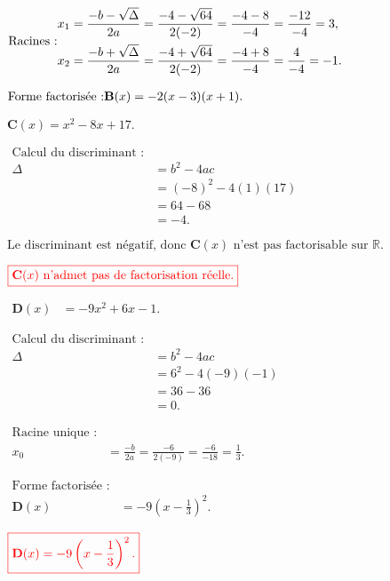 \documentclass[12pt,a4paper]{article}
\begin{document}
\begin{enumerate}
\(
\text{Racines :}\\
\begin{aligned}
x_1 &= \frac{-b - \sqrt{\Delta}}{2a} = \frac{-4 - \sqrt{64}}{2(-2)} = \frac{-4 - 8}{-4} = \frac{-12}{-4} = 3, \\
x_2 &= \frac{-b + \sqrt{\Delta}}{2a} = \frac{-4 + \sqrt{64}}{2(-2)} = \frac{-4 + 8}{-4} = \frac{4}{-4} = -1.
\end{aligned}
\)

\(\text{Forme factorisée :}\\
\begin{aligned}
\textbf{B}(x) &= -2(x - 3)(x + 1).
\end{aligned}
\)

\textcolor{red}{}

\(
\textbf{C}(x) = x^2 - 8x + 17.
\)

\(
\begin{aligned}
\text{Calcul du discriminant :} \\
\Delta &= b^2 - 4ac \\
      &= (-8)^2 - 4(1)(17) \\
      &= 64 - 68 \\
      &= -4.
\end{aligned}
\)

\(
\text{Le discriminant est négatif, donc } \textbf{C}(x) \text{ n'est pas factorisable sur } \mathbb{R}.
\)

\(
\textcolor{red}{\boxed{\textbf{C}(x) \text{ n'admet pas de factorisation réelle.}}}
\)

\(
\begin{aligned}
\textbf{D}(x) &= -9x^2 + 6x - 1.
\end{aligned}
\)

\(
\begin{aligned}
\text{Calcul du discriminant :} \\
\Delta &= b^2 - 4ac \\
      &= 6^2 - 4(-9)(-1) \\
      &= 36 - 36 \\
      &= 0.
\end{aligned}
\)

\(
\begin{aligned}
\text{Racine unique :} \\
x_0 &= \frac{-b}{2a} = \frac{-6}{2(-9)} = \frac{-6}{-18} = \frac{1}{3}.
\end{aligned}
\)

\(
\begin{aligned}
\text{Forme factorisée :} \\
\textbf{D}(x) &= -9(x - \frac{1}{3})^2.
\end{aligned}
\)

\(
\textcolor{red}{\boxed{\textbf{D}(x) = -9\left(x - \frac{1}{3}\right)^2.}}
\)

\end{enumerate}
\end{document}
